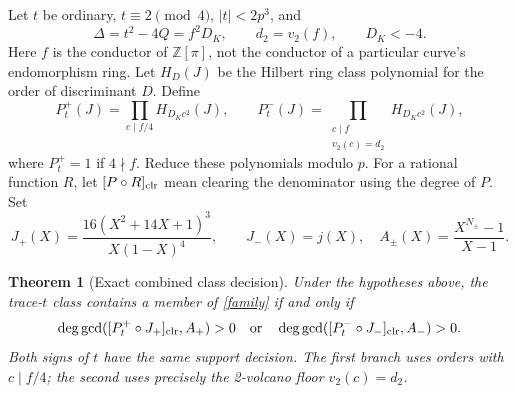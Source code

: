 \documentclass[11pt]{article}
\newtheorem{theorem}{Theorem}
\begin{document}
Let $t$ be ordinary, $t\equiv2\pmod4$, $|t|<2p^3$, and
\[
 \Delta=t^2-4Q=f^2D_K,\qquad d_2=v_2(f),\qquad D_K<-4.
\]
Here $f$ is the conductor of $\mathbb Z[\pi]$, not the conductor of a particular
curve's endomorphism ring. Let $H_D(J)$ be the Hilbert ring class polynomial
for the order of discriminant $D$. Define
\[
 P_t^+(J)=\prod_{c\mid f/4}H_{D_Kc^2}(J),\qquad
 P_t^-(J)=\prod_{\substack{c\mid f\\v_2(c)=d_2}}H_{D_Kc^2}(J),
\]
where $P_t^+=1$ if $4\nmid f$. Reduce these polynomials modulo $p$.
For a rational function $R$, let $[P\circ R]_{\rm clr}$ mean clearing the
denominator using the degree of $P$. Set
\[
 J_+(X)=\frac{16(X^2+14X+1)^3}{X(1-X)^4},\qquad J_-(X)=j(X),
 \quad A_\pm(X)=\frac{X^{N_\pm}-1}{X-1}.
\]

\begin{theorem}[Exact combined class decision]\label{cm}
Under the hypotheses above, the trace-$t$ class contains a member of
\eqref{family} if and only if
\[
 \deg\gcd([P_t^+\circ J_+]_{\rm clr},A_+)>0
 \quad\text{or}\quad
 \deg\gcd([P_t^-\circ J_-]_{\rm clr},A_-)>0.
\]
Both signs of $t$ have the same support decision. The first branch uses
orders with $c\mid f/4$; the second uses precisely the 2-volcano floor
$v_2(c)=d_2$.
\end{theorem}
\end{document}
